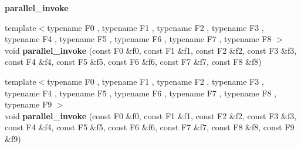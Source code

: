 \begin{Indent}{\bf parallel\+\_\+invoke}
\begin{DoxyCompactItemize}
\item 
\hypertarget{group__algorithms_gaeca8b72507d67dd023dae728bdc89896}{}{\footnotesize template$<$typename F0 , typename F1 , typename F2 , typename F3 , typename F4 , typename F5 , typename F6 , typename F7 , typename F8 $>$ }\\void {\bfseries parallel\+\_\+invoke} (const F0 \&f0, const F1 \&f1, const F2 \&f2, const F3 \&f3, const F4 \&f4, const F5 \&f5, const F6 \&f6, const F7 \&f7, const F8 \&f8)\label{group__algorithms_gaeca8b72507d67dd023dae728bdc89896}

\item 
\hypertarget{group__algorithms_ga17c9f95fac24b2b7b62f325f511ee7be}{}{\footnotesize template$<$typename F0 , typename F1 , typename F2 , typename F3 , typename F4 , typename F5 , typename F6 , typename F7 , typename F8 , typename F9 $>$ }\\void {\bfseries parallel\+\_\+invoke} (const F0 \&f0, const F1 \&f1, const F2 \&f2, const F3 \&f3, const F4 \&f4, const F5 \&f5, const F6 \&f6, const F7 \&f7, const F8 \&f8, const F9 \&f9)\label{group__algorithms_ga17c9f95fac24b2b7b62f325f511ee7be}

\end{DoxyCompactItemize}
\end{Indent}
